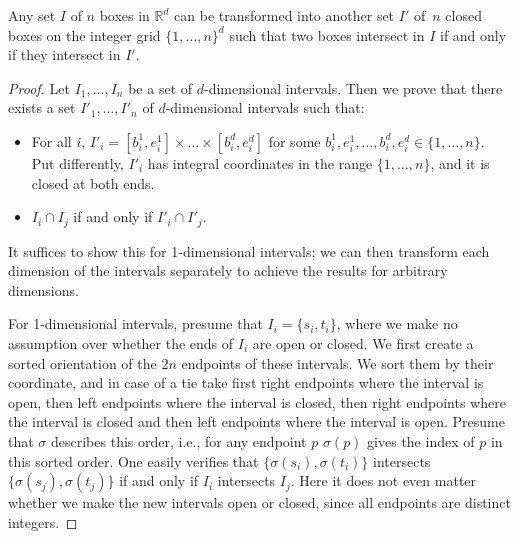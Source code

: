 \documentclass[runningheads]{llncs}
\begin{document}
\newcommand{\lemTransformToInteger}{
Any set $I$ of $n$ boxes in $\mathbb R^d$ can be transformed into another set $I'$ of~$n$ closed boxes on 
the integer grid $\{ 1, \ldots, n\}^d$ 
such that two boxes intersect in $I$ if and only if they intersect in $I'$.
}
\begin{lemma}
\label{lem:transformToInteger}
\label{lem:gtransformToInteger}
\lemTransformToInteger
\end{lemma}

\begin{proof}
Let $I_1,\dots,I_n$ be a set of $d$-dimensional intervals.
Then we prove that there exists a set $I'_1,\dots,I'_n$ of
$d$-dimensional intervals such that:
\begin{itemize}
\item For all $i$, $I'_i= [b_i^1,e_i^1] \times \dots \times
[b_i^d,e_i^d]$ for some
  $b_i^1,e_i^1,\dots,b_i^d,e_i^d\in \{1,\dots,n\}$.  Put differently,
  $I'_i$ has integral coordinates in the range $\{1,\dots,n\}$,
  and it is closed at both ends.
\item $I_i\cap I_j$ if and only if $I'_i\cap I'_j$.
\end{itemize}


It suffices to show this for 1-dimensional intervals; we can then
transform each dimension of the intervals separately to achieve the
results for arbitrary dimensions.
  
For 1-dimensional intervals, presume that $I_i=\{s_i,t_i\}$, where we
make no assumption over whether the ends of $I_i$ are open or closed.
We first create a sorted orientation of the $2n$ endpoints of these
intervals.  We sort them by their coordinate, and in case of a tie
take 
first right endpoints where the interval is open, 
then left endpoints where the interval is closed,
then right endpoints where the interval is closed 
and then left endpoints where the interval is open.  
Presume that $\sigma$ describes this order, i.e., for any endpoint $p$
$\sigma(p)$ gives the index of $p$ in this sorted order.
One easily verifies that $\{\sigma(s_i),\sigma(t_i)\}$ intersects 
$\{\sigma(s_j),\sigma(t_j)\}$
if and only if $I_i$ intersects $I_j$.  Here it does not even matter
whether we make the new intervals open or closed, since all endpoints
are distinct integers.


\end{proof}
\end{document}
